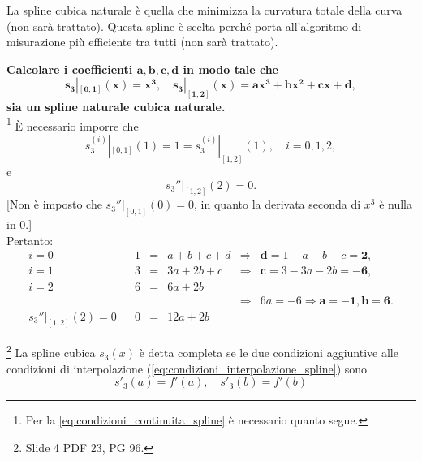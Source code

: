 La spline cubica naturale è quella che minimizza la curvatura totale della curva (non sarà trattato). Questa spline è scelta perché porta all'algoritmo di misurazione più efficiente tra tutti (non sarà trattato).

\begin{example}
	\textbf{Calcolare i coefficienti $\boldsymbol{a,b,c,d}$ in modo tale che}
	\begin{equation*}
		\boldsymbol{s_3|_{[0,1]}(x) = x^3,\quad s_3|_{[1,2]}(x) = a x^3 + b x^2 + c x + d,}
	\end{equation*}
	\textbf{sia un spline naturale cubica naturale.}\\
	\footnote{Per la \ref{eq:condizioni_continuita_spline} è necessario quanto segue.} È necessario imporre che
	\begin{equation*}
		s^{(i)}_3|_{[0,1]}(1) = 1 = s_3^{(i)}|_{[1,2]}(1),\quad i=0,1,2,
	\end{equation*}
	e
	\begin{equation*}
		s_3''|_{[1,2]}(2) = 0.
	\end{equation*}
	[Non è imposto che $s_3''|_{[0,1]}(0) = 0$, in quanto la derivata seconda di $x^3$ è nulla in 0.]\\
	Pertanto:
	\begin{equation*}
		\begin{matrix}
			i = 0 && 1 &=& a + b + c + d &\Rightarrow& \boldsymbol{d=} 1 - a - b - c \boldsymbol{= 2},\\
			i = 1  && 3 &=& 3a + 2b + c &\Rightarrow& \boldsymbol{c=} 3-3a-2b \boldsymbol{=-6},\\
			i = 2 && 6 &=& 6a + 2b\\
			&&&&&\Rightarrow& 6a = -6 \Rightarrow \boldsymbol{a=-1}, \boldsymbol{b=6}.\\
			s_3''|_{[1,2]}(2) = 0 && 0 &=& 12a + 2b
		\end{matrix}
	\end{equation*}
\end{example}

\begin{definition}\footnote{Slide 4 PDF 23, PG 96.}
	La spline cubica $s_3(x)$ è detta completa se le due condizioni aggiuntive alle condizioni di interpolazione (\ref{eq:condizioni_interpolazione_spline}) sono
	\begin{equation}\label{eq:condizioni_spline_cubica_completa}
	    \boxed{s'_3(a)=f'(a),\quad s'_3(b)=f'(b)}
	\end{equation}
\end{definition}

